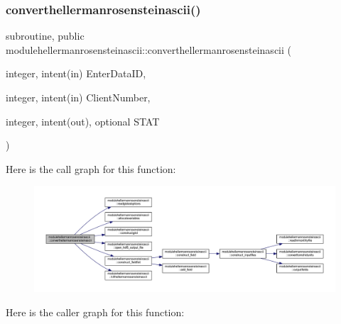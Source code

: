 \subsubsection{\texorpdfstring{converthellermanrosensteinascii()}{converthellermanrosensteinascii()}}
{\footnotesize\ttfamily subroutine, public modulehellermanrosensteinascii\+::converthellermanrosensteinascii (\begin{DoxyParamCaption}\item[{integer, intent(in)}]{Enter\+Data\+ID,  }\item[{integer, intent(in)}]{Client\+Number,  }\item[{integer, intent(out), optional}]{S\+T\+AT }\end{DoxyParamCaption})}

Here is the call graph for this function\+:\nopagebreak
\begin{figure}[H]
\begin{center}
\leavevmode
\includegraphics[width=350pt]{namespacemodulehellermanrosensteinascii_ae9a4ebb5ba70b59aa745588ca89b7a95_cgraph}
\end{center}
\end{figure}
Here is the caller graph for this function\+:\nopagebreak
